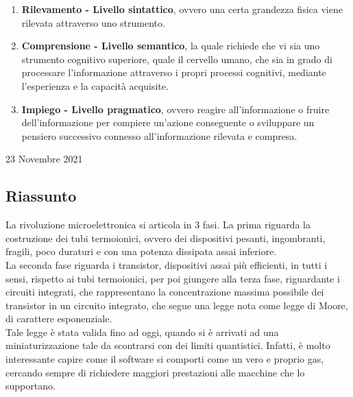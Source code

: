 \documentclass[a4paper]{extarticle}
\begin{document}
\begin{enumerate}
    \item \textbf{Rilevamento - Livello sintattico}, ovvero una certa grandezza fisica viene rilevata attraverso uno strumento.

    \item \textbf{Comprensione - Livello semantico}, la quale richiede che vi sia uno strumento cognitivo superiore, quale il cervello umano, che sia in grado di processare l'informazione attraverso i propri processi cognitivi, mediante l'esperienza e la capacità acquisite.

    \item \textbf{Impiego - Livello pragmatico}, ovvero reagire all'informazione o fruire dell'informazione per compiere un'azione conseguente o sviluppare un pensiero successivo connesso all'informazione rilevata e compresa.
\end{enumerate}

\newpage
\begin{center}
    23 Novembre 2021
\end{center}
\subsection{Riassunto}
La rivoluzione microelettronica si articola in \(3\) fasi. La prima riguarda la costruzione dei tubi termoionici, ovvero dei dispositivi pesanti, ingombranti, fragili, poco duraturi e con una potenza dissipata assai inferiore.\\
La seconda fase riguarda i transistor, dispositivi assai più efficienti, in tutti i sensi, rispetto ai tubi termoionici, per poi giungere alla terza fase, riguardante i circuiti integrati, che rappresentano la concentrazione massima possibile dei transistor in un circuito integrato, che segue una legge nota come legge di Moore, di carattere esponenziale.\\
Tale legge è stata valida fino ad oggi, quando si è arrivati ad una miniaturizzazione tale da scontrarsi con dei limiti quantistici. Infatti, è molto interessante capire come il software si comporti come un vero e proprio gas, cercando sempre di richiedere maggiori prestazioni alle macchine che lo supportano.\\
\end{document}
